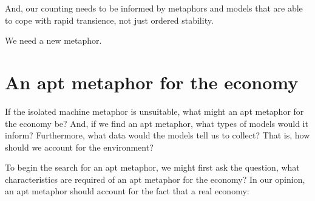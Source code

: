 And, our counting needs to be informed by metaphors and models that are
able to cope with rapid transience,
not just ordered stability.

We need a new metaphor.


\section{An apt metaphor for the economy}
\label{sec:apt_metaphor}

If the isolated machine metaphor is unsuitable, 
what might an apt metaphor for the economy be?
And, if we find an apt metaphor, what types of models would it inform?
Furthermore, what data would the models tell us to collect?
That is, how should we account for the environment?

To begin the search for an apt metaphor, 
we might first ask the question, 
what characteristics are required of an apt metaphor for the economy?
In our opinion, an apt metaphor should account for the fact 
that a real economy:

